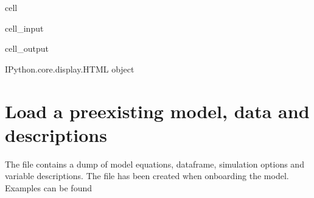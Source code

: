 \documentclass[letterpaper,10pt,english]{jupyterBook}
\begin{document}
\begin{sphinxuseclass}{cell}\begin{sphinxVerbatimInput}

\begin{sphinxuseclass}{cell_input}
\begin{sphinxVerbatim}[commandchars=\\\{\}]
    
   
 
\end{sphinxVerbatim}

\end{sphinxuseclass}\end{sphinxVerbatimInput}
\begin{sphinxVerbatimOutput}

\begin{sphinxuseclass}{cell_output}
\begin{sphinxVerbatim}[commandchars=\\\{\}]
\PYGZlt{}IPython.core.display.HTML object\PYGZgt{}
\end{sphinxVerbatim}

\end{sphinxuseclass}\end{sphinxVerbatimOutput}

\end{sphinxuseclass}

\section{Load a pre\sphinxhyphen{}existing model, data and descriptions}
\label{\detokenize{content/06_ModelAnalytics/EigenValues:load-a-pre-existing-model-data-and-descriptions}}
\sphinxAtStartPar
The file  contains a dump of model equations, dataframe, simulation options and variable descriptions. The file has been created when onboarding the model.
Examples can be found 
\end{document}
